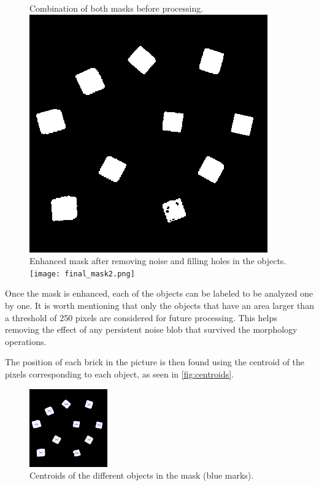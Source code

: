 \begin{figure}[H]
	\captionbox  %
	{
		Combination of both masks before processing.             
		\label{fig:final_mask}                                  
	}                                                                 
	{                                                                  
		\includegraphics[width=.25\textwidth]{figures/final_mask.png}         
	}                                                                    
	\hspace{5pt}                                                          
	\captionbox
	{       
		Enhanced mask after removing noise and filling holes in the objects.
		\label{fig:final_mask2}                                     
	}
	{
		\texttt{[image: final\_mask2.png]}            
	}                                                                             
\end{figure}

Once the mask is enhanced, each of the objects can be labeled to be analyzed one by one. It is worth mentioning that only the objects that have an area larger than a threshold of 250 pixels are considered for future processing. This helps removing the effect of any persistent noise blob that survived the morphology operations.

The position of each brick in the picture is then found using the centroid of the pixels corresponding to each object, as seen in \autoref{fig:centroids}.

\begin{figure}[H]
	\includegraphics[width=0.3\textwidth]{figures/centroids.png}
	\caption{Centroids of the different objects in the mask (blue marks).}
	\label{fig:centroids}
\end{figure}

